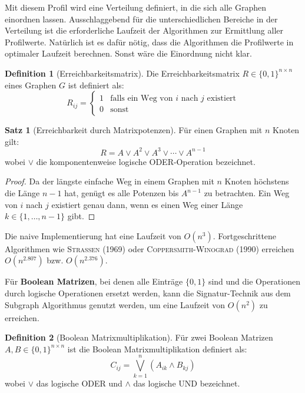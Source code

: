 ﻿\documentclass[a4paper,12pt]{article}
\theoremstyle{definition}
\newtheorem{definition}{Definition}
\newtheorem{satz}{Satz}
\begin{document}
	Mit diesem Profil wird eine Verteilung definiert, in die sich alle Graphen einordnen lassen. Ausschlaggebend für die unterschiedlichen Bereiche in der Verteilung ist die erforderliche Laufzeit der Algorithmen zur Ermittlung aller Profilwerte. Natürlich ist es dafür nötig, dass die Algorithmen die Profilwerte in optimaler Laufzeit berechnen. Sonst wäre die Einordnung nicht klar.
	
	\begin{definition}[Erreichbarkeitsmatrix]
		Die Erreichbarkeitsmatrix $R \in \{0,1\}^{n \times n}$ eines Graphen $G$ ist definiert als:
		\[
		R_{ij} = \begin{cases} 1 & \text{falls ein Weg von } i \text{ nach } j \text{ existiert} \\ 0 & \text{sonst} \end{cases}
		\]
	\end{definition}
	
	\begin{satz}[Erreichbarkeit durch Matrixpotenzen]
		Für einen Graphen mit $n$ Knoten gilt:
		\[
		R = A \vee A^2 \vee A^3 \vee \cdots \vee A^{n-1}
		\]
		wobei $\vee$ die komponentenweise logische ODER-Operation bezeichnet.
	\end{satz}
	
	\begin{proof}
		Da der längste einfache Weg in einem Graphen mit $n$ Knoten höchstens die Länge $n-1$ hat, genügt es alle Potenzen bis $A^{n-1}$ zu betrachten. Ein Weg von $i$ nach $j$ existiert genau dann, wenn es einen Weg einer Länge $k \in \{1, \ldots, n-1\}$ gibt.
	\end{proof}
	
	Die naive Implementierung hat eine Laufzeit von $O(n^3)$. Fortgeschrittene Algorithmen wie \textsc{Strassen} (1969) oder \textsc{Coppersmith-Winograd} (1990) erreichen $O(n^{2.807})$ bzw. $O(n^{2.376})$.
	
	Für \textbf{Boolean Matrizen}, bei denen alle Einträge $\{0, 1\}$ sind und die Operationen durch logische Operationen ersetzt werden, kann die Signatur-Technik aus dem Subgraph Algorithmus genutzt werden, um eine Laufzeit von $O(n^2)$ zu erreichen.
	
	\begin{definition}[Boolean Matrixmultiplikation]
		Für zwei Boolean Matrizen $A, B \in \{0,1\}^{n \times n}$ ist die Boolean Matrixmultiplikation definiert als:
		\[
		C_{ij} = \bigvee_{k=1}^{n} (A_{ik} \wedge B_{kj})
		\]
		wobei $\vee$ das logische ODER und $\wedge$ das logische UND bezeichnet.
	\end{definition}
	
\end{document}
